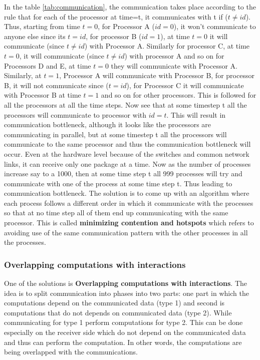 \documentclass[12pt]{book}
\begin{document}
In the table \ref{tab:communication}, 
the communication takes place according to the rule that for each of the processor at time=t, it communicates with t if ($t\neq id$).
Thus, starting from time $t=0$, for Processor A ($id=0$), it won't communicate to anyone else since its $t=id$, for processor B ($id=1$), at time $t=0$
it will communicate (since $t\neq id$) with Processor A.
Similarly for processor C, at time $t=0$, it will communicate (since $t\neq id$) with processor A and so on for Processors D and E, at time $t=0$ they will communicate with Processor A. 
Similarly, at $t=1$, Processor A will communicate with Processor B, for processor B, it will not communicate since ($t =id$), for Processor C it will communicate with Processor B at time $t=1$ and so on for other processors.
This is followed for all the processors at all the time steps.
Now see that at some timestep t all the processors will communicate to processor with $id=t$. This will result in communication bottleneck, although it looks like the processors are communicating in parallel,
but at some timestep t all the processors will communicate to the same processor and thus the communication bottleneck will occur. Even at the hardware level because of the switches and common network links, it can receive only one package at a time.
Now as the number of processes increase say to a 1000, then at some time step t all 999 processes will try and communicate with one of the process at some time step t. Thus leading to communication bottleneck.
The solution is to come up with an algorithm where each process follows a different order in which it communicate with the processes so that at no time step all of them end up communicating with the same processor.
This is called \textbf{minimizing contention and hotspots} which refers to avoiding use of the same communication pattern with the other processes in all the processes.

\subsubsection{Overlapping computations with interactions}
One of the solutions is \textbf{Overlapping computations with interactions}. The idea is to split communication into phases into two parts: one part in which the computations depend 
on  the communicated data (type 1) and second is computations that do not depends on communicated data (type 2). While communicating for type 1 perform computations for type 2.
This can be done especially on the receiver side which do not depend on the communicated data and thus can perform the computation. In other words, the computations are being overlapped with the communications.
\end{document}
